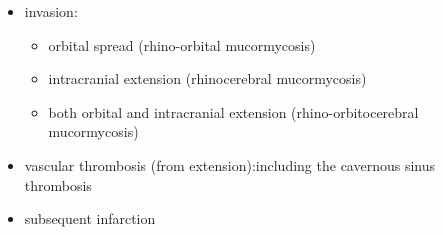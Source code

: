 \begin{itemize}
	\tightlist
	\item
	invasion:
	
	\begin{itemize}
		\tightlist
		\item
		orbital spread (rhino-orbital mucormycosis)
		\item
		intracranial extension (rhinocerebral mucormycosis)
		\item
		both orbital and intracranial extension (rhino-orbitocerebral mucormycosis)
	\end{itemize}
	\item
	vascular thrombosis (from extension):including the cavernous sinus thrombosis
	\item
	subsequent infarction
\end{itemize}